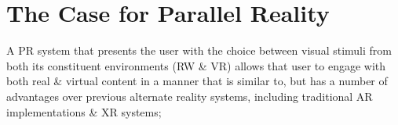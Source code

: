 







\section{The Case for Parallel Reality}


A PR system that presents the user with the choice between visual stimuli from both its constituent environments (RW \& VR) allows that user to engage with both real \& virtual content in a manner that is similar to, but has a number of advantages over previous alternate reality systems, including traditional AR implementations \& XR systems;

